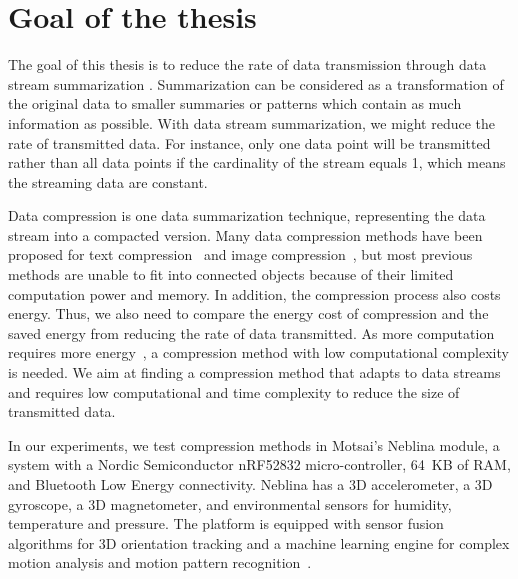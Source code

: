 
\section{Goal of the thesis}



The goal of this thesis is to reduce the rate of data transmission through data
stream summarization . Summarization can be considered as a transformation of the
original data to smaller summaries or patterns which contain as much information as
possible. With data stream summarization, we might reduce the
rate of transmitted data. For instance, only one data point will be transmitted
rather than all data points if the cardinality of the stream equals 1, which
means the streaming data are constant. 

Data compression is one data summarization technique, representing
the data stream into a compacted version. Many data compression methods have
been proposed for text compression~\cite{shanmugasundaram2011comparative,
sayood2017introduction} and image compression~\cite{shum2003survey,
zaineldin2015image}, but most previous methods are unable to fit into
connected objects because of their limited computation power and memory.
 In addition, the compression process also costs energy. Thus, we also
need to compare the energy cost of compression and the saved energy from
reducing the rate of data transmitted. As more computation requires more
energy~\cite{pope2018accelerometer}, a
compression method with low computational complexity is needed. We aim at finding a
compression method that adapts to data streams and requires low computational and
time complexity to reduce the size of transmitted data.


In our experiments, we test compression methods in Motsai's Neblina module, a
system with a Nordic Semiconductor nRF52832 micro-controller, 64~KB of RAM, and
Bluetooth Low Energy connectivity. Neblina has a 3D accelerometer, a 3D
gyroscope, a 3D magnetometer, and environmental sensors for humidity,
temperature and pressure. The platform is equipped with sensor fusion algorithms
for 3D orientation tracking and a machine learning engine for complex motion
analysis and motion pattern recognition~\cite{sarbishei2016accuracy}.


